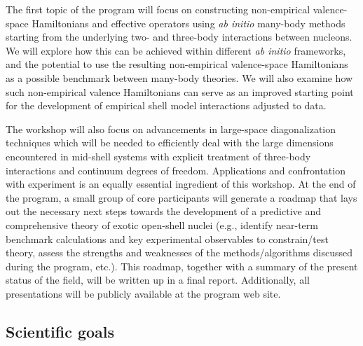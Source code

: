\documentclass[%
twoside,                 %
final,                   %
10pt]{article}
\begin{document}
\noindent
The first topic of the program will focus on constructing non-empirical 
valence-space Hamiltonians and effective operators using \emph{ab initio} 
many-body methods starting from the underlying two- and three-body interactions 
between nucleons. We will explore how this can be achieved within different  \emph{ab initio} frameworks, and the potential to use the resulting non-empirical
valence-space Hamiltonians as a possible benchmark between many-body 
theories. We will also examine how such non-empirical valence Hamiltonians can 
serve as an improved starting point for the development of empirical shell model 
interactions adjusted to data. 

The workshop will also focus on advancements in large-space diagonalization techniques which will be needed to efficiently 
deal with the large dimensions encountered in mid-shell systems with explicit treatment of three-body interactions and continuum degrees of freedom. Applications and confrontation with experiment is an equally essential ingredient of this workshop.
At the end of the program, a small group of core participants will generate a roadmap that lays out the necessary next steps towards the development of a predictive and comprehensive theory of exotic open-shell nuclei (e.g., identify near-term benchmark calculations and key experimental observables to constrain/test theory, assess the strengths and weaknesses of the methods/algorithms discussed during the program, etc.). This roadmap, together with a summary of the present status of the field, will be written up in a final report. Additionally, all presentations will be publicly available at the program web site.





\subsection*{Scientific goals}

\end{document}
